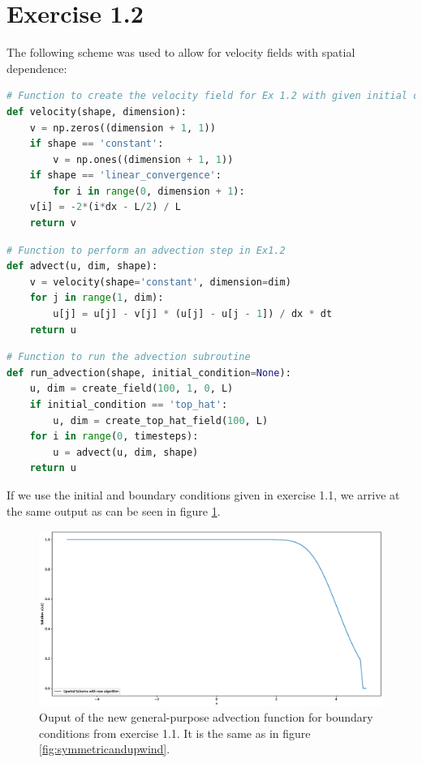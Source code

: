 \documentclass{scrartcl}
\begin{document}
\newpage

\section*{Exercise 1.2}

The following scheme was used to allow for velocity fields with spatial dependence:
\begin{lstlisting}[title=Function that returns the velocity fields for the different cases.,  language=Python, frame=single]
# Function to create the velocity field for Ex 1.2 with given initial conditions
def velocity(shape, dimension):
	v = np.zeros((dimension + 1, 1))
	if shape == 'constant':
		v = np.ones((dimension + 1, 1))
	if shape == 'linear_convergence':
		for i in range(0, dimension + 1):
	v[i] = -2*(i*dx - L/2) / L
	return v
\end{lstlisting}
\begin{lstlisting}[title=Implementation of a single advection step.,  language=Python, frame=single]
# Function to perform an advection step in Ex1.2
def advect(u, dim, shape):
	v = velocity(shape='constant', dimension=dim)
	for j in range(1, dim):
		u[j] = u[j] - v[j] * (u[j] - u[j - 1]) / dx * dt
	return u
\end{lstlisting}
\begin{lstlisting}[title=Function to perform the advection steps.,  language=Python, frame=single]
# Function to run the advection subroutine
def run_advection(shape, initial_condition=None):
	u, dim = create_field(100, 1, 0, L)
	if initial_condition == 'top_hat':
		u, dim = create_top_hat_field(100, L)
	for i in range(0, timesteps):
		u = advect(u, dim, shape)
	return u
\end{lstlisting}
If we use the initial and boundary conditions given in exercise 1.1, we arrive at the same output as can be seen in figure \ref{fig:upwindnew}.

\begin{figure}[H]
	\centering
	\includegraphics[width=1\linewidth]{Plots/upwind_new}
	\caption{Ouput of the new general-purpose advection function for boundary conditions from exercise 1.1. It is the same as in figure \ref{fig:symmetricandupwind}.}
	\label{fig:upwindnew}
\end{figure}
\end{document}
